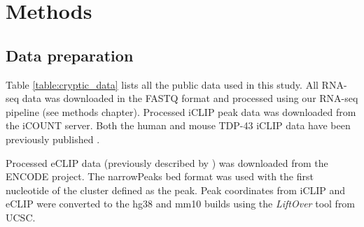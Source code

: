 \section{Methods}

\subsection{Data preparation}
Table \ref{table:cryptic_data} lists all the public data used in this study. All RNA-seq data was downloaded in the FASTQ format and processed using our RNA-seq pipeline (see methods chapter).
Processed iCLIP peak data was downloaded from the iCOUNT server. Both the human and mouse TDP-43 iCLIP data have been previously published \citep{Tollervey2011,Rogelj2012}.

Processed eCLIP data (previously described by \citep{Van_Nostrand2016-su}) was downloaded from the ENCODE project. The narrowPeaks bed format was used with the first nucleotide of the cluster defined as the peak. Peak coordinates from iCLIP and eCLIP were converted to the hg38 and mm10 builds using the \emph{LiftOver} tool from UCSC. 

